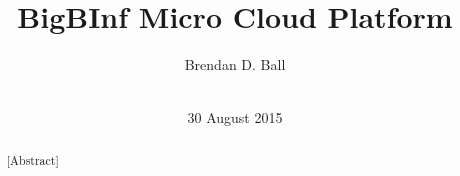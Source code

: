\documentclass{sig-alternate-05-2015}
\begin{document}


\title{BigBInf Micro Cloud Platform}

\author{
\alignauthor
Brendan D. Ball\\
       \\
}

\date{30 August 2015}


\maketitle
\begin{abstract}
[Abstract]
\end{abstract}
\end{document}
